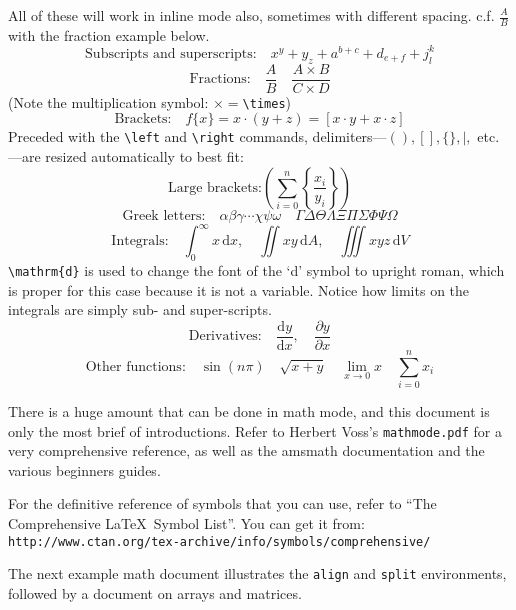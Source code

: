 \documentclass[12pt,article,fleqn]{memoir}
\begin{document}
All of these will work in inline mode also, sometimes with different spacing. c.f. $\frac AB$ with the fraction example below.
\[
\text{Subscripts and superscripts:} \quad x^y + y_z + a^{b+c} + d_{e +f} + j^k_l
\]
%
\[
\text{Fractions:} \quad \frac A B \quad \frac{A \times B}{C \times D}
\]
%
(Note the multiplication symbol: $\times = {}$\verb|\times|)
%
\[
\text{Brackets:} \quad f\{x\} = x\cdot(y+z) = [x\cdot y+x\cdot z]
\]
%
Preceded with the \verb|\left| and \verb|\right| commands, delimiters---$(),[],\{\},|,$ etc.---are resized automatically to best fit:
\[
\text{Large brackets:} \left(\sum^n_{i=0} \left\{\frac{x_i}{y_i}\right\}\right)
\]
%
\[
\text{Greek letters:} \quad \alpha \beta \gamma \cdots \chi \psi \omega \quad \Gamma \Delta \Theta \Lambda \Xi \Pi \Sigma \Phi \Psi \Omega
\]
%
\[
\text{Integrals:} \quad \int^\infty_0 x\,\mathrm{d}x , \quad \iint xy\,\mathrm{d}A , \quad \iiint xyz\,\mathrm{d}V
\]
%
\verb|\mathrm{d}| is used to change the font of the `d' symbol to upright roman, which is proper for this case because it is not a variable. Notice how limits on the integrals are simply sub- and super-scripts.
%
\[
\text{Derivatives:} \quad \frac{\mathrm{d}y}{\mathrm{d}x} , \quad \frac{\partial y}{\partial x}
\]
%
\[
\text{Other functions:} \quad \sin(n\pi) \quad \sqrt{x+y} \quad \lim_{x\rightarrow 0} x \quad \sum^n_{i=0} x_i
\]

There is a huge amount that can be done in math mode, and this document is only the most brief of introductions. Refer to Herbert Voss's \texttt{mathmode.pdf} for a very comprehensive reference, as well as the \textsf{amsmath} documentation and the various beginners guides.

For the definitive reference of symbols that you can use, refer to ``The Comprehensive \LaTeX\ Symbol List''. You can get it from:\\
\verb|http://www.ctan.org/tex-archive/info/symbols/comprehensive/|

The next example math document illustrates the \texttt{align} and \texttt{split} environments, followed by a document on arrays and matrices.
\end{document}
